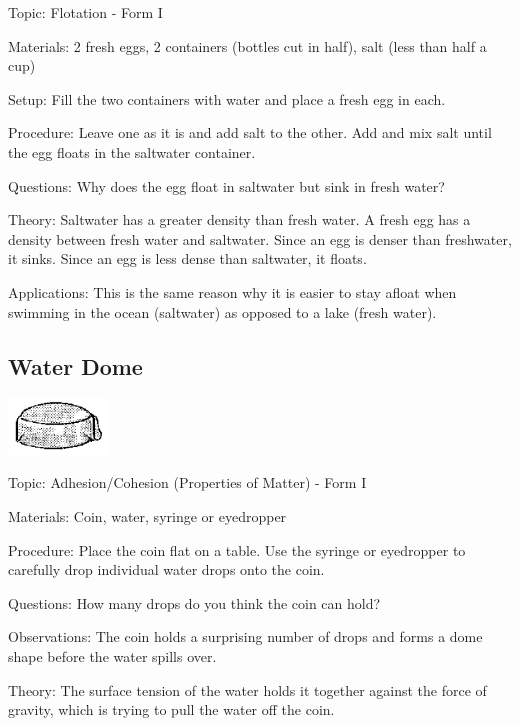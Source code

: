 \begin{multicols}{2}
\begin{description*}
\item[Topic:]{Flotation - Form I}
\item[Materials:]{2 fresh eggs, 2 containers (bottles cut in half), salt (less than half a cup)}
\item[Setup:]{Fill the two containers with water and place a fresh egg in each.}
\item[Procedure:]{Leave one as it is and add salt to the other. Add and mix salt until the egg floats in the saltwater container.}
\item[Questions:]{Why does the egg float in saltwater but sink in fresh water?}
\item[Theory:]{Saltwater has a greater density than fresh water. A fresh egg has a density between fresh water and saltwater. Since an egg is denser than freshwater, it sinks. Since an egg is less dense than saltwater, it floats.}
\item[Applications:]{This is the same reason why it is easier to stay afloat when swimming in the ocean (saltwater) as opposed to a lake (fresh water).}
\end{description*}

\vfill
\pagebreak

\subsection{Water Dome}

\begin{center}
\includegraphics[width=0.2\textwidth]{./img/source/water-dome.png}
\end{center}

\begin{description*}
\item[Topic:]{Adhesion/Cohesion (Properties of Matter) - Form I}
\item[Materials:]{Coin, water, syringe or eyedropper}
\item[Procedure:]{Place the coin flat on a table. Use the syringe or eyedropper to carefully drop individual water drops onto the coin.}
\item[Questions:]{How many drops do you think the coin can hold?}
\item[Observations:]{The coin holds a surprising number of drops and forms a dome shape before the water spills over.}
\item[Theory:]{The surface tension of the water holds it together against the force of gravity, which is trying to pull the water off the coin.}
\end{description*}


\end{multicols}
